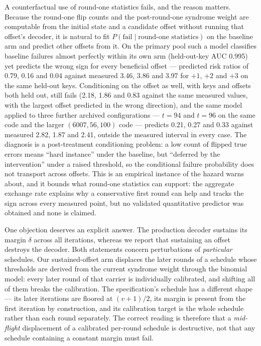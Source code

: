 \documentclass[lettersize,journal]{IEEEtran}
\begin{document}
A counterfactual use of round-one statistics fails, and the reason matters. Because the round-one flip counts and the post-round-one syndrome weight are computable from the initial state and a candidate offset without running that offset's decoder, it is natural to fit $P(\text{fail}\mid\text{round-one statistics})$ on the baseline arm and predict other offsets from it. On the primary pool such a model classifies baseline failures almost perfectly within its own arm (held-out-key AUC 0.995) yet predicts the wrong sign for every beneficial offset --- predicted risk ratios of 0.79, 0.16 and 0.04 against measured 3.46, 3.86 and 3.97 for $+1$, $+2$ and $+3$ on the same held-out keys. Conditioning on the offset as well, with keys and offsets both held out, still fails (2.18, 1.86 and 0.83 against the same measured values, with the largest offset predicted in the wrong direction), and the same model applied to three further archived configurations --- $t=94$ and $t=96$ on the same code and the larger $(6007,56,100)$ code --- predicts 0.21, 0.27 and 0.33 against measured 2.82, 1.87 and 2.41, outside the measured interval in every case. The diagnosis is a post-treatment conditioning problem: a low count of flipped true errors means ``hard instance'' under the baseline, but ``deferred by the intervention'' under a raised threshold, so the conditional failure probability does not transport across offsets. This is an empirical instance of the hazard \cite{annechini2025closedform} warns about, and it bounds what round-one statistics can support: the aggregate exchange rate explains why a conservative first round can help and tracks the sign across every measured point, but no validated quantitative predictor was obtained and none is claimed.

One objection deserves an explicit answer. The production decoder sustains its margin $\delta$ across all iterations, whereas we report that sustaining an offset destroys the decoder. Both statements concern perturbations of \emph{particular} schedules. Our sustained-offset arm displaces the later rounds of a schedule whose thresholds are derived from the current syndrome weight through the binomial model: every later round of that carrier is individually calibrated, and shifting all of them breaks the calibration. The specification's schedule has a different shape --- its later iterations are floored at $(v{+}1)/2$, its margin is present from the first iteration by construction, and its calibration target is the whole schedule rather than each round separately. The correct reading is therefore that a \emph{mid-flight} displacement of a calibrated per-round schedule is destructive, not that any schedule containing a constant margin must fail.
\end{document}

